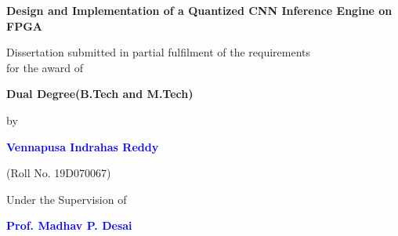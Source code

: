 
\thispagestyle{empty}
\singlespacing
\begin{titlepage}
\begin{center}
    \centering
     
      
  {{\Large \textbf{Design and Implementation of a Quantized CNN Inference Engine  on FPGA
}\par}}
    \vspace{1cm}%
     
    \vspace{1cm}
    {Dissertation submitted in partial fulfilment of the requirements \\ for the award of 
    \par}
    \vspace{0.1cm}
    {
    \textbf{\large Dual Degree(B.Tech and M.Tech)} \par}
    \vspace{0.3cm}


    {\large by\par}
    \vspace{0.1cm}
    {\large \textbf{\textcolor{blue}{Vennapusa Indrahas Reddy}}\par} 
    (Roll No. 19D070067)
    \vspace{0.4cm}
    
    {Under the Supervision of \par}
    {\large \textbf{\textbf{\textcolor{blue}{Prof. Madhav P. Desai}}}\par}
     \vspace{0.8 cm}


\end{center}
\end{titlepage}

